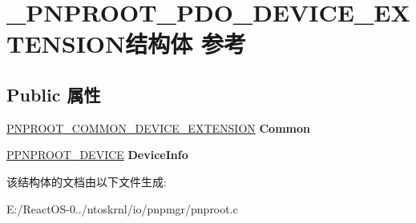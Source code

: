 \hypertarget{struct___p_n_p_r_o_o_t___p_d_o___d_e_v_i_c_e___e_x_t_e_n_s_i_o_n}{}\section{\+\_\+\+P\+N\+P\+R\+O\+O\+T\+\_\+\+P\+D\+O\+\_\+\+D\+E\+V\+I\+C\+E\+\_\+\+E\+X\+T\+E\+N\+S\+I\+O\+N结构体 参考}
\label{struct___p_n_p_r_o_o_t___p_d_o___d_e_v_i_c_e___e_x_t_e_n_s_i_o_n}
\subsection*{Public 属性}
\begin{DoxyCompactItemize}
\item 
\mbox{\label{struct___p_n_p_r_o_o_t___p_d_o___d_e_v_i_c_e___e_x_t_e_n_s_i_o_n_a7dcacd6986df78e41a8fb35a9f87fc7d}} 
\hyperlink{struct___p_n_p_r_o_o_t___c_o_m_m_o_n___d_e_v_i_c_e___e_x_t_e_n_s_i_o_n}{P\+N\+P\+R\+O\+O\+T\+\_\+\+C\+O\+M\+M\+O\+N\+\_\+\+D\+E\+V\+I\+C\+E\+\_\+\+E\+X\+T\+E\+N\+S\+I\+ON} {\bfseries Common}
\item 
\mbox{\label{struct___p_n_p_r_o_o_t___p_d_o___d_e_v_i_c_e___e_x_t_e_n_s_i_o_n_a5eca7700c312a5ec00ce69087d02f526}} 
\hyperlink{struct___p_n_p_r_o_o_t___d_e_v_i_c_e}{P\+P\+N\+P\+R\+O\+O\+T\+\_\+\+D\+E\+V\+I\+CE} {\bfseries Device\+Info}
\end{DoxyCompactItemize}


该结构体的文档由以下文件生成\+:\begin{DoxyCompactItemize}
\item 
E\+:/\+React\+O\+S-\/0../ntoskrnl/io/pnpmgr/pnproot.\+c\end{DoxyCompactItemize}
